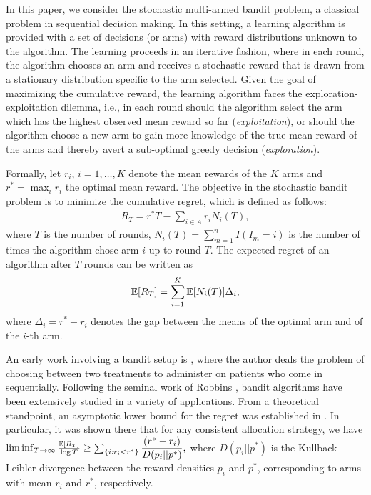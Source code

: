 In this paper, we consider the stochastic multi-armed bandit problem, a classical problem in sequential decision making. In this setting,  a learning algorithm is provided with a set of decisions (or arms) with reward distributions unknown to the algorithm. The learning proceeds in an iterative fashion, where in each round, the algorithm chooses an arm and receives a stochastic reward that is drawn from a stationary distribution specific to the arm selected.  
Given the goal of maximizing the cumulative reward, the learning algorithm faces the exploration-exploitation dilemma, i.e., in each round should the algorithm select the arm which has the highest observed mean reward so far 
(\textit{exploitation}), or should the algorithm choose a new arm to gain more knowledge of the true mean reward of the arms and thereby avert a sub-optimal greedy decision (\textit{exploration}). 

Formally, let $r_i$, $i=1,\ldots,K$ denote the mean rewards of the $K$ arms and $r^* = \max_i r_i$ the optimal mean reward. The objective in the stochastic bandit problem is to minimize the cumulative regret, which is defined as follows:
\begin{align*}
R_{T}=r^{*}T - \sum_{i\in A} r_{i}N_{i}(T),
\end{align*}
where $T$ is the number of rounds, $N_{i}(T)=\sum_{m=1}^n I(I_m=i)$ is the number of times the algorithm chose arm $i$ up to round $T$.
The expected regret of an algorithm after $T$ rounds can be written as
\begin{align*}
\mathbb{E}[R_{T}]= \sum_{i=1}^K \mathbb{E}[N_i(T)] \Delta_i,
\end{align*}
where $\Delta_{i}=r^{*}-r_{i}$ denotes the gap between the means of the optimal arm and of the $i$-th arm. 


                                                                                                                                          


An early work involving a bandit setup is \cite{thompson1933likelihood}, where the author deals the problem of choosing between two treatments to administer on patients who come in sequentially. Following the seminal work of Robbins \cite{robbins1952some}, bandit algorithms have been extensively studied in a variety of applications. 
From a theoretical standpoint, an asymptotic lower bound for the regret was established in \cite{lai1985asymptotically}. In particular, it was shown there that for any consistent allocation strategy, we have
$\liminf_{T \to \infty}\frac{\mathbb{E}[R_{T}]}{\log T}\geq\sum_{\{i:r_{i}<r^{*}\}}\dfrac{(r^{*}-r_{i})}{D(p_{i}||p^{*})},$
where $D(p_{i}||p^{*})$ is the Kullback-Leibler divergence between the reward densities $p_{i}$ and $p^{*}$, corresponding to arms with mean $r_{i}$ and $r^{*}$, respectively.

